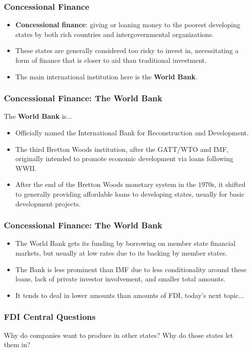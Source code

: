 \documentclass[handout]{beamer}
\begin{document}
\begin{frame} 
	\frametitle{\LARGE{Concessional Finance}}
	\begin{itemize}
		\item \textbf{Concessional finance}: giving or loaning money to the poorest developing states by both rich countries and intergovernmental organizations. \pause
		\item These states are generally considered too risky to invest in, necessitating a form of finance that is closer to aid than traditional investment. \pause
		\item The main international institution here is the \textbf{World Bank}. 	
	\end{itemize}
\end{frame}

\begin{frame} 
	\frametitle{\LARGE{Concessional Finance}: The World Bank}
	The \textbf{World Bank} is...
	\begin{itemize}
		\item Officially named the International Bank for Reconstruction and Development. \pause
		\item The third Bretton Woods institution, after the GATT/WTO and IMF, originally intended to promote economic development via loans following WWII. 
		\item After the end of the Bretton Woods monetary system in the 1970s, it shifted to generally providing affordable loans to developing states, usually for basic development projects. 
	\end{itemize}
\end{frame}

\begin{frame} 
	\frametitle{\LARGE{Concessional Finance}: The World Bank}
	\begin{itemize}
		\item The World Bank gets its funding by borrowing on member state financial markets, but usually at low rates due to its backing by member states. \pause
		\item The Bank is less prominent than IMF due to less conditionality around these loans, lack of private investor involvement, and smaller total amounts.
		\item It tends to deal in lower amounts than amounts of FDI, today's next topic...
	\end{itemize}
\end{frame}

\begin{frame} 
	\frametitle{\LARGE{FDI Central Questions}}
	\centering 
	\Large{Why do companies want to produce in other states? Why do those states let them in?}
\end{frame}
\end{document}
